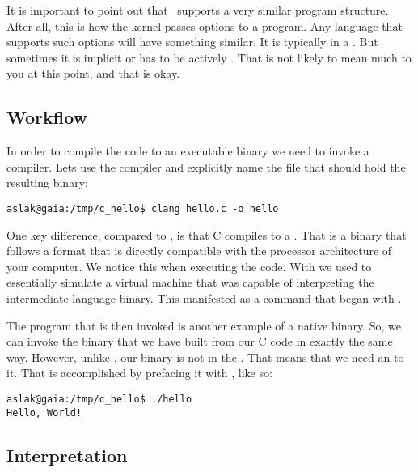 It is important to point out that \csharp\ supports a very similar program structure. After all, this is how the kernel passes options to a program. Any language that supports such options will have something similar. It is typically in a . But sometimes it is implicit or has to be actively . That is not likely to mean much to you at this point, and that is okay.

\subsection{Workflow}

In order to compile the code to an executable binary we need to invoke a compiler. Lets use the  compiler and explicitly name the file that should hold the resulting binary:

\begin{verbatim}
aslak@gaia:/tmp/c_hello$ clang hello.c -o hello
\end{verbatim}

One key difference, compared to \csharp, is that C compiles to a . That is a binary that follows a format that is directly compatible with the processor architecture of your computer. We notice this when executing the code. With \csharp we used  to essentially simulate a virtual machine that was capable of interpreting the intermediate language binary. This manifested as a command that began with .

The  program that is then invoked is another example of a native binary. So, we can invoke the binary that we have built from our C code in exactly the same way. However, unlike , our binary is not in the . That means that we need an  to it. That is accomplished by prefacing it with , like so:

\begin{verbatim}
aslak@gaia:/tmp/c_hello$ ./hello
Hello, World!
\end{verbatim}


\subsection{Interpretation}

